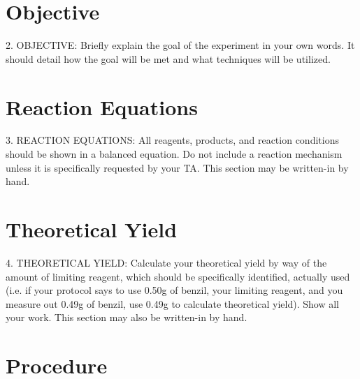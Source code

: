 \documentclass[letterpaper,amsmath,amssymb,prb,preprint,12pt]{revtex4-1}%
\begin{document}
\section{Objective}


2. OBJECTIVE: Briefly explain the goal of the experiment in your own words. It
should detail how the goal will be met and what techniques will be utilized.

\section{Reaction Equations}


3. REACTION EQUATIONS: All reagents, products, and reaction conditions should
be shown in a balanced equation. Do not include a reaction mechanism unless it is
specifically requested by your TA. This section may be written-in by hand.

\section{Theoretical Yield}


4. THEORETICAL YIELD: Calculate your theoretical yield by way of the amount of
limiting reagent, which should be specifically identified, actually used (i.e. if your
protocol says to use 0.50g of benzil, your limiting reagent, and you measure out
0.49g of benzil, use 0.49g to calculate theoretical yield). Show all your work. This
section may also be written-in by hand.

\section{Procedure}
\end{document}
